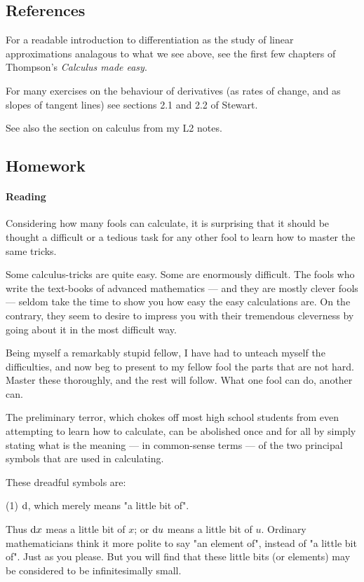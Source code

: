 \subsection{References}
For a readable introduction to differentiation as the study of linear approximations analagous
to what we see above, see the first few chapters of Thompson's \emph{Calculus made easy}.

For many exercises on the behaviour of derivatives (as rates of change, and as slopes of tangent
lines) see sections 2.1 and 2.2 of Stewart.

See also the section on calculus from my L2 notes.

\subsection{Homework}
\paragraph{Reading}
Considering how many fools can calculate, it is surprising that it should be thought a difficult or
a tedious task for any other fool to learn how to master the same tricks.

Some calculus-tricks are quite easy. Some are enormously difficult. The fools who write the text-books
of advanced mathematics --- and they are mostly clever fools --- seldom take the time to show you how
easy the easy calculations are. On the contrary, they seem to desire to impress you with their tremendous
cleverness by going about it in the most difficult way.

Being myself a remarkably stupid fellow, I have had to unteach myself the difficulties, and now beg
to present to my fellow fool the parts that are not hard. Master these thoroughly, and the rest will
follow. What one fool can do, another can.

The preliminary terror, which chokes off most high school students from even attempting to learn
how to calculate, can be abolished once and for all by simply stating what is the meaning --- in
common-sense terms --- of the two principal symbols that are used in calculating.

These dreadful symbols are:

(1) $ \dif{} $, which merely means "a little bit of".

Thus $ \dif{x} $ meas a little bit of $ x $;
or $ \dif{u} $ means a little bit of $ u $. Ordinary mathematicians think it more polite to say
"an element of", instead of "a little bit of". Just as you please. But you will find that these
little bits (or elements) may be considered to be infinitesimally small.

